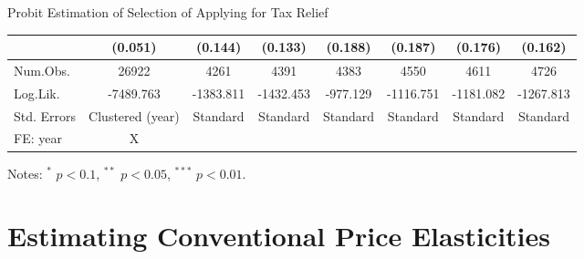 \documentclass[
  ignorenonframetext,
  aspectratio=169,
]{beamer}
\begin{document}
\begin{frame}{Probit Estimation of Selection of Applying for Tax Relief}
\begin{table}
\begin{threeparttable}
\begin{tabular}[t]{lccccccc}
 & (0.051) & (0.144) & (0.133) & (0.188) & (0.187) & (0.176) & (0.162)\\
\midrule
Num.Obs. & 26922 & 4261 & 4391 & 4383 & 4550 & 4611 & 4726\\
Log.Lik. & -7489.763 & -1383.811 & -1432.453 & -977.129 & -1116.751 & -1181.082 & -1267.813\\
Std. Errors & Clustered (year) & Standard & Standard & Standard & Standard & Standard & Standard\\
FE: year & X &  &  &  &  &  & \\
\bottomrule
\end{tabular}
\begin{tablenotes}
\item Notes: $^{*}$ $p < 0.1$, $^{**}$ $p < 0.05$, $^{***}$ $p < 0.01$.
\end{tablenotes}
\end{threeparttable}
\end{table}
\end{frame}

\hypertarget{estimating-conventional-price-elasticities}{%
\section{Estimating Conventional Price Elasticities}\label{estimating-conventional-price-elasticities}}
\end{document}
